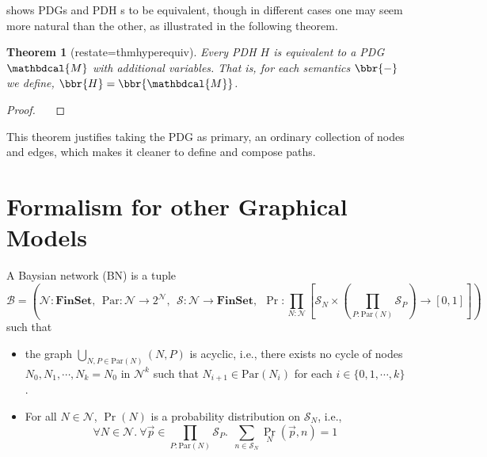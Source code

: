 \documentclass[letterpaper]{article} %
\theoremstyle{plain}
\newtheorem{theorem}{Theorem}%
\theoremstyle{definition}
\theoremstyle{remark}
\newcommand{\todo}[1]{{\color{red}\ \!\Large\smash{\textbf{[}}{\normalsize\textsc{todo:} #1}\ \!\smash{\textbf{]}}}}
\newcommand{\dg}[1]{\mathbdcal{#1}}
\begin{document}
{ shows PDGs and PDH s to be equivalent, though in different cases one may seem more natural than the other, as illustrated in the following theorem.

\begin{theorem}[restate=thmhyperequiv]\label{thm:hyperequiv}
	Every PDH $H$ is equivalent to a PDG $\dg M$ with additional variables. That is, for each semantics $\bbr{-}$ we define, $\bbr{H} = \bbr{\dg M}$.
\end{theorem}
\begin{proof}
	\todo{}
\end{proof}

This theorem justifies taking the PDG as primary, an ordinary collection of nodes and edges, which makes it cleaner to define and compose paths. 


\section{Formalism for other Graphical Models}
\begin{defn}
	A Baysian network (BN) is a tuple
	\[
	\mathcal B = \left(\mathcal N : \mathbf{FinSet}, ~~\mathrm{Par}: \mathcal N \to 2^{\mathcal N},~~ \mathcal S: \mathcal N \to \mathbf{FinSet},~~\Pr: \prod_{N : \mathcal N}  \left[ \mathcal S_N \times \left(\prod_{P : \mathrm{Par}(N)} \mathcal S_P\right)  \to [0,1] \right] \right)
	\]
	such that
	\begin{itemize}[nosep]
		\item the graph $\bigcup_{N, P \in \mathrm{Par}(N)}(N, P)$ is acyclic, i.e., there exists no cycle of nodes $N_0, N_1, \cdots, N_k = N_0$ in $\mathcal N^k$ such that $N_{i+1} \in \mathrm{Par}(N_i)$ for each $i \in \{0, 1, \cdots, k\}$.
		\item For all $N \in \mathcal N$, $\Pr(N)$ is a probability distribution on $\mathcal S_N$, i.e., 
		\[ \forall N\in \mathcal N.~\forall \vec{p} \in {\prod_{P : \mathrm{Par}(N)} \mathcal S_P}.~~ \sum_{n \in \mathcal S_{N}} \Pr_N(\vec{p}, n) = 1\]
	\end{itemize}
\end{defn}


}
\end{document}
